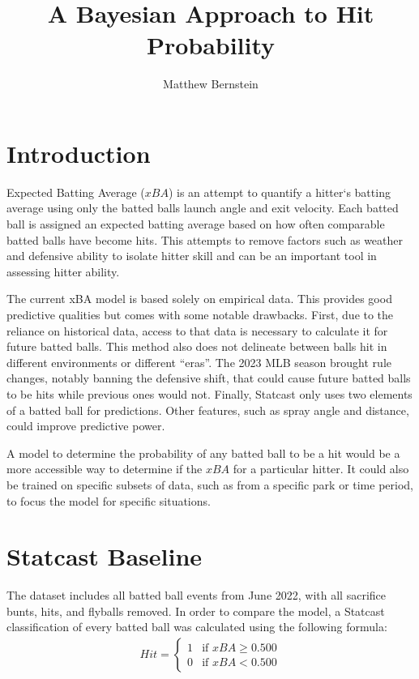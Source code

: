 \documentclass[12pt,letterpaper]{article}
\title{A Bayesian Approach to Hit Probability}
\author{Matthew Bernstein}
\begin{document}
\maketitle

\section*{Introduction}
Expected Batting Average ($xBA$) is an attempt to quantify a hitter`s batting average using only the batted balls launch angle and exit velocity. Each batted ball is assigned an expected batting average based on how often comparable batted balls have become hits. This attempts to remove factors such as weather and defensive ability to isolate hitter skill and can be an important tool in assessing hitter ability.

The current xBA model is based solely on empirical data. This provides good predictive qualities but comes with some notable drawbacks. First, due to the reliance on historical data, access to that data is necessary to calculate it for future batted balls. This method also does not delineate between balls hit in different environments or different “eras”. The 2023 MLB season brought rule changes, notably banning the defensive shift, that could cause future batted balls to be hits while previous ones would not. Finally, Statcast only uses two elements of a batted ball for predictions. Other features, such as spray angle and distance, could improve predictive power. 

A model to determine the probability of any batted ball to be a hit would be a more accessible way to determine if the $xBA$ for a particular hitter. It could also be trained on specific subsets of data, such as from a specific park or time period, to focus the model for specific situations. 

\section*{Statcast Baseline}
The dataset includes all batted ball events from June 2022, with all sacrifice bunts, hits, and flyballs removed. In order to compare the model, a Statcast classification of every batted ball was calculated using the following formula:
\begin{align*}
    Hit =
        \begin{cases}
            1 & \text{if } xBA \ge 0.500\\
            0 & \text{if } xBA < 0.500
        \end{cases}
\end{align*}
\end{document}
